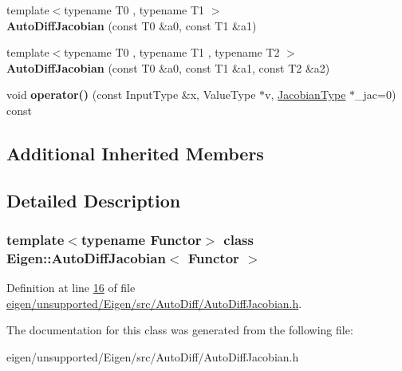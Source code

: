\begin{DoxyCompactItemize}
\item 
\mbox{\label{class_eigen_1_1_auto_diff_jacobian_a459df1c8203bd0aef5ea3ed964d6e8f1}} 
{\footnotesize template$<$typename T0 , typename T1 $>$ }\\{\bfseries Auto\+Diff\+Jacobian} (const T0 \&a0, const T1 \&a1)
\item 
\mbox{\label{class_eigen_1_1_auto_diff_jacobian_abcc3d282a198c67c3c0b15ee81763f5c}} 
{\footnotesize template$<$typename T0 , typename T1 , typename T2 $>$ }\\{\bfseries Auto\+Diff\+Jacobian} (const T0 \&a0, const T1 \&a1, const T2 \&a2)
\item 
\mbox{\label{class_eigen_1_1_auto_diff_jacobian_a7e9380a43f2f256ad3f00d683a943f1e}} 
void {\bfseries operator()} (const Input\+Type \&x, Value\+Type $\ast$v, \hyperlink{group___core___module_class_eigen_1_1_matrix}{Jacobian\+Type} $\ast$\+\_\+jac=0) const
\end{DoxyCompactItemize}
\subsection*{Additional Inherited Members}


\subsection{Detailed Description}
\subsubsection*{template$<$typename Functor$>$\newline
class Eigen\+::\+Auto\+Diff\+Jacobian$<$ Functor $>$}



Definition at line \hyperlink{eigen_2unsupported_2_eigen_2src_2_auto_diff_2_auto_diff_jacobian_8h_source_l00016}{16} of file \hyperlink{eigen_2unsupported_2_eigen_2src_2_auto_diff_2_auto_diff_jacobian_8h_source}{eigen/unsupported/\+Eigen/src/\+Auto\+Diff/\+Auto\+Diff\+Jacobian.\+h}.



The documentation for this class was generated from the following file\+:\begin{DoxyCompactItemize}
\item 
eigen/unsupported/\+Eigen/src/\+Auto\+Diff/\+Auto\+Diff\+Jacobian.\+h\end{DoxyCompactItemize}
